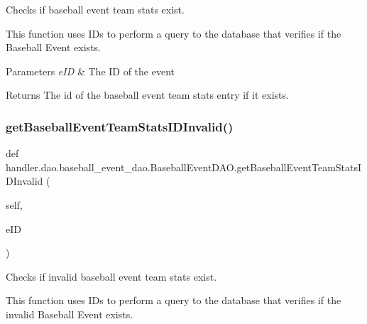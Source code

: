 Checks if baseball event team stats exist. 

This function uses I\+Ds to perform a query to the database that verifies if the Baseball Event exists.


\begin{DoxyParams}{Parameters}
{\em e\+ID} & The ID of the event\\
\hline
\end{DoxyParams}
\begin{DoxyReturn}{Returns}
The id of the baseball event team stats entry if it exists. 
\end{DoxyReturn}
\mbox{\label{classhandler_1_1dao_1_1baseball__event__dao_1_1_baseball_event_d_a_o_a709d6118be7ab2b47c57e8bd89d6bcba}} 
\subsubsection{\texorpdfstring{get\+Baseball\+Event\+Team\+Stats\+I\+D\+Invalid()}{getBaseballEventTeamStatsIDInvalid()}}
{\footnotesize\ttfamily def handler.\+dao.\+baseball\+\_\+event\+\_\+dao.\+Baseball\+Event\+D\+A\+O.\+get\+Baseball\+Event\+Team\+Stats\+I\+D\+Invalid (\begin{DoxyParamCaption}\item[{}]{self,  }\item[{}]{e\+ID }\end{DoxyParamCaption})}



Checks if invalid baseball event team stats exist. 

This function uses I\+Ds to perform a query to the database that verifies if the invalid Baseball Event exists.


